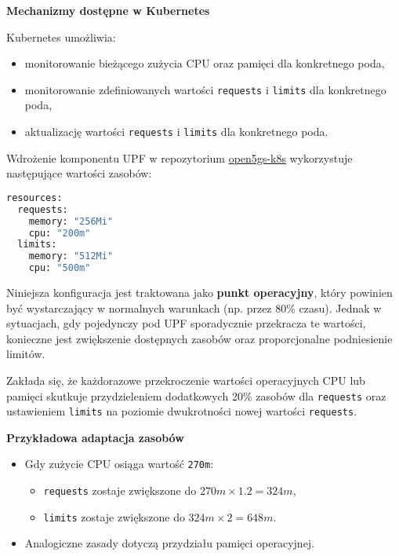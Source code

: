 \textbf{Mechanizmy dostępne w Kubernetes}

Kubernetes umożliwia:
\begin{itemize}
    \item monitorowanie bieżącego zużycia CPU oraz pamięci dla konkretnego poda,
    \item monitorowanie zdefiniowanych wartości \texttt{requests} i \texttt{limits} dla konkretnego poda,
    \item aktualizację wartości \texttt{requests} i \texttt{limits} dla konkretnego poda.
\end{itemize}

Wdrożenie komponentu UPF w repozytorium \href{https://github.com/niloysh/open5gs-k8s}{open5gs-k8s} wykorzystuje następujące wartości zasobów:

\begin{lstlisting}[language=sh, caption=Konfiguracja zasobów dla UPF w Open5GS]
resources:
  requests:
    memory: "256Mi"
    cpu: "200m"
  limits:
    memory: "512Mi"
    cpu: "500m"
\end{lstlisting}

Niniejsza konfiguracja jest traktowana jako \textbf{punkt operacyjny}, który powinien być wystarczający w normalnych warunkach (np. przez 80\% czasu). Jednak w sytuacjach, gdy pojedynczy pod UPF sporadycznie przekracza te wartości, konieczne jest zwiększenie dostępnych zasobów oraz proporcjonalne podniesienie limitów.

Zakłada się, że każdorazowe przekroczenie wartości operacyjnych CPU lub pamięci skutkuje przydzieleniem dodatkowych 20\% zasobów dla \texttt{requests} oraz ustawieniem \texttt{limits} na poziomie dwukrotności nowej wartości \texttt{requests}.

\textbf{Przykładowa adaptacja zasobów}

\begin{itemize}
    \item Gdy zużycie CPU osiąga wartość \texttt{270m}:
    \begin{itemize}
        \item \texttt{requests} zostaje zwiększone do \( 270m \times 1.2 = 324m \),
        \item \texttt{limits} zostaje zwiększone do \( 324m \times 2 = 648m \).
    \end{itemize}
    \item Analogiczne zasady dotyczą przydziału pamięci operacyjnej.
\end{itemize}

